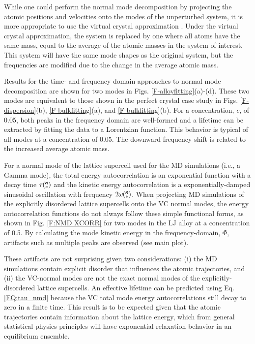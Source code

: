 While one could perform the normal mode decomposition by projecting 
the atomic positions and velocities onto the modes of the unperturbed 
system, it is more appropriate to use the virtual crystal approximation 
\cite{abeles_lattice_1963,garg_role_2011,
tian_phonon_2012,lindsay_thermal_2012}. Under the virtual 
crystal approximation, the system is replaced by one where all atoms 
have the same mass, equal to the average of the atomic masses in the 
system of interest. This system will have the same mode shapes as the 
original system, but the frequencies are modified due to the change 
in the average atomic mass.

Results for the time- and frequency domain approaches to normal mode 
decomposition are shown for two modes in 
Figs. \ref{F-alloyfitting}(a)-(d). These two modes are equivalent to 
those shown in the perfect crystal case study in 
Figs. \ref{F-dispersion}(b), \ref{F-bulkfitting}(a), and 
\ref{F-bulkfitting}(b). For a concentration, $c$, of 0.05, both peaks 
in the frequency domain are well-formed and a lifetime can be extracted 
by fitting the data to a Lorentzian function. This behavior is typical 
of all modes at a concentration of 0.05. The downward frequency shift 
is related to the increased average atomic mass.

For a normal mode of the lattice supercell 
used for the MD simulations (i.e., a Gamma mode), 
the total energy autocorrelation is an exponential function  
with a decay time $\tau\mspace{-4.0mu}\left(\mspace{-8.0mu} \begin{smallmatrix}&\pmb{\kappa} \\&\nu\end{smallmatrix} \mspace{-3.0mu}\right)$ and the kinetic energy autocorrelation is a 
exponentially-damped sinusoidal oscillation with frequency 
$2\omega\mspace{-4.0mu}\left(\mspace{-8.0mu} \begin{smallmatrix}&\pmb{\kappa} \\&\nu\end{smallmatrix} \mspace{-3.0mu}\right)$.\cite{mcgaughey_predicting_2013} 
When projecting MD simulations  
of the explicitly disordered lattice supercells 
onto the VC normal modes, 
the energy autocorrelation functions 
do not always follow these simple functional forms, 
as shown in Fig. \ref{F:NMD XCORR} for two modes in the LJ alloy at a 
concentration of 0.5.  
By calculating the mode kinetic energy in the  
frequency-domain, $\Phi$,\cite{larkin_comparison_2012} artifacts such as 
multiple peaks are observed (see main plot).   

These artifacts are not surprising given two considerations: 
(i) the MD simulations 
contain explicit disorder that influences the atomic trajectories, 
and (ii) the VC-normal modes are not the exact normal modes of the 
explicitly-disordered lattice supercells. 
An effective lifetime can be predicted 
using Eq. \eqref{EQ:tau_nmd} 
because the VC total mode energy autocorrelations 
still decay to zero in a finite time. This result is to be expected 
given that the atomic trajectories contain 
information about the lattice energy, which from general statistical 
physics principles will have exponential relaxation behavior in an 
equilibrium ensemble.
\cite{landau_statistical_1980,srivastava_physics_1990,rajabpour_thermal_2010}

